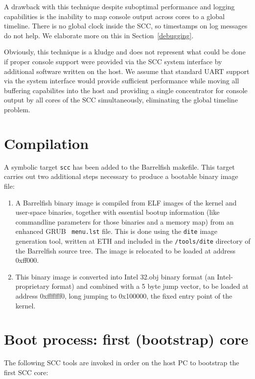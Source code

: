 \documentclass[a4paper,twoside]{report} %
\begin{document}
A drawback with this technique despite suboptimal performance and
logging capabilities is the inability to map console output across
cores to a global timeline. There is no global clock inside the SCC,
so timestamps on log messages do not help. We elaborate more on this
in Section~\ref{debugging}.

Obviously, this technique is a kludge and does not represent what
could be done if proper console support were provided via the SCC
system interface by additional software written on the host. We assume
that standard UART support via the system interface would provide
sufficient performance while moving all buffering capabilites into the
host and providing a single concentrator for console output by all
cores of the SCC simultaneously, eliminating the global timeline
problem.

\section{Compilation}

A symbolic target \texttt{scc} has been added to the Barrelfish
makefile. This target carries out two additional steps necessary to
produce a bootable binary image file:

\begin{enumerate}
\item A Barrelfish binary image is compiled from ELF images of the
  kernel and user-space binaries, together with essential bootup
  information (like commandline parameters for those binaries and a
  memory map) from an enhanced GRUB~\cite{grub} \texttt{menu.lst}
  file. This is done using the \texttt{dite} image generation tool,
  written at ETH and included in the \texttt{/tools/dite} directory of
  the Barrelfish source tree. The image is relocated to be loaded at
  address 0xff000.

\item This binary image is converted into Intel 32.obj binary format
  (an Intel-proprietary format) and combined with a 5 byte jump
  vector, to be loaded at address 0xfffffff0, long jumping to
  0x100000, the fixed entry point of the kernel.
\end{enumerate}

\section{Boot process: first (bootstrap) core}

The following SCC tools are invoked in order on the host PC to
bootstrap the first SCC core:
\end{document}
